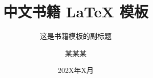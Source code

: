 \documentclass[openany,twoside,zihao=-4]{zhbook}
\title{中文书籍 \LaTeX{} 模板}  %
\subtitle{这是书籍模板的副标题}  %
\author{某某某}  %
\date{202X年X月}  %
\begin{document}
\maketitle

%



\frontmatter





%


%


\maketoc

\makelof

\makelot






\mainmatter


















\end{document}
